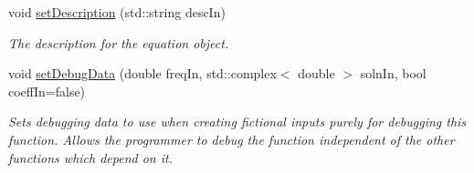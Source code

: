 \begin{DoxyCompactItemize}
void \hyperlink{classosea_1_1ofreq_1_1_equationof_motion_a307e0f8ada534f1fb17c06073101f8ab}{set\-Description} (std\-::string desc\-In)
\begin{DoxyCompactList}\small\item\em The description for the equation object. \end{DoxyCompactList}\item 
void \hyperlink{classosea_1_1ofreq_1_1_equationof_motion_a91bffb1d1129135369d6120033232b5c}{set\-Debug\-Data} (double freq\-In, std\-::complex$<$ double $>$ soln\-In, bool coeff\-In=false)
\begin{DoxyCompactList}\small\item\em Sets debugging data to use when creating fictional inputs purely for debugging this function. Allows the programmer to debug the function independent of the other functions which depend on it. \end{DoxyCompactList}\end{DoxyCompactItemize}
